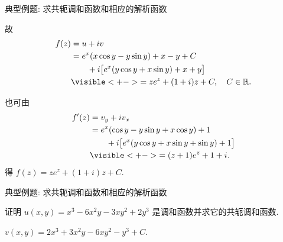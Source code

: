 \begin{frame}{典型例题: 求共轭调和函数和相应的解析函数}
\onslide<+->
\begin{solutionc}
故
\vspace{-1.5\baselineskip}
\begin{align*}
f(z)&=u+iv\\
&=e^x(x\cos y-y\sin y)+x-y+C\\
&\qquad+i\bigl[e^x(y\cos y+x\sin y)+x+y\bigr]\\
&\visible<+->{=ze^z+(1+i)z+C,\quad C\in\BR.}
\end{align*}
\end{solutionc}
\onslide<+->\noindent
也可由
\vspace{-1.5\baselineskip}
\begin{align*}
f'(z)&=v_y+iv_x\\
&=e^x(\cos y-y\sin y+x\cos y)+1\\
&\qquad+i\bigl[e^x(y\cos y+x\sin y+\sin y)+1\bigr]\\
&\visible<+->{=(z+1)e^z+1+i.}
\end{align*}
\onslide<+->
得 $f(z)=ze^z+(1+i)z+C$.
\end{frame}


\begin{frame}{典型例题: 求共轭调和函数和相应的解析函数}
\onslide<+->
\begin{exercise}
证明 $u(x,y)=x^3-6x^2y-3xy^2+2y^3$ 是调和函数并求它的共轭调和函数.
\end{exercise}
\onslide<+->
\begin{answer}
$v(x,y)=2x^3+3x^2y-6xy^2-y^3+C$.
\end{answer}
\end{frame}


